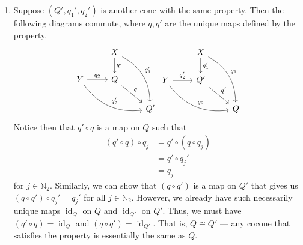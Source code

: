 \documentclass[letterpaper, 12pt]{hmcpset}
\begin{document}
\begin{solution}
\begin{enumerate}
		\item
			Suppose $(Q', q_{1}', q_{2}')$ is another cone with the same property. Then the following diagrams commute, where $q, q'$ are the unique maps defined by the property.
			\[
				\begin{tikzcd}
						          & X \ar[d, "q_{1}"] \ar[rdd, "q_{1}'", bend left] \\
					Y \ar[r, "q_{2}"] \ar[rrd, bend right, "q_{2}'"] & Q \ar[rd, "q"] \\
							  & & Q'
				\end{tikzcd}
				\begin{tikzcd}
						          & X \ar[d, "q_{1}'"] \ar[rdd, "q_{1}", bend left] \\
					Y \ar[r, "q_{2}'"] \ar[rrd, bend right, "q_{2}"] & Q' \ar[rd, "q'"] \\
							  & & Q
				\end{tikzcd}
			\]
			Notice then that $q' \circ q$ is a map on $Q$ such that
			\[
				\begin{split}
					(q' \circ q) \circ q_{j} & = q' \circ (q \circ q_{j}) \\
								 & = q' \circ q_{j}' \\
								 & = q_{j}
				\end{split}
			\]
			for $j \in \mathbb{N}_{2}$. Similarly, we can show that $(q \circ q')$ is a map on $Q'$ that gives us $(q \circ q') \circ q_{j}' = q_{j}'$ for all $j \in \mathbb{N}_2$. However, we already have such necessarily unique maps $\operatorname{id}_{Q}$ on $Q$ and $\operatorname{id}_{Q'}$ on $Q'$. Thus, we must have $(q' \circ q) = \operatorname{id}_{Q}$ and $(q \circ q') = \operatorname{id}_{Q'}$. That is, $Q \cong Q'$ --- any cocone that satisfies the property is essentially the same as $Q$.
	\end{enumerate}
\end{solution}
	
\end{document}

